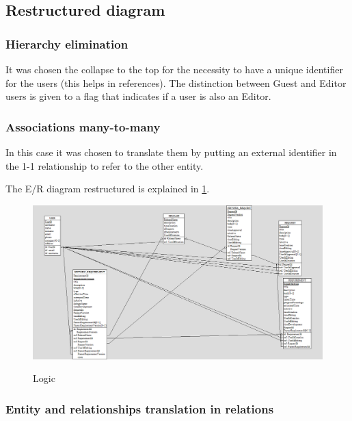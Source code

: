 \documentclass[12pt, a4paper]{report}
\begin{document}
\subsection*{Restructured diagram}

\subsubsection*{Hierarchy elimination}

It was chosen the collapse to the top for the necessity to have a unique identifier for the users (this helps in references).
The distinction between Guest and Editor users is given to a flag that indicates if a user is also an Editor.

\subsubsection*{Associations many-to-many}

In this case it was chosen to translate them by putting an external identifier in the 1-1 relationship to refer to the other
entity.

The E/R diagram restructured is explained in \ref{fig:ER_logic}.

\begin{figure}[H]
\centering
\caption{Logic}
\includegraphics[width=\textwidth]{E-R logic}
\label{fig:ER_logic}
\end{figure}

\subsubsection*{Entity and relationships translation in relations}
\end{document}
